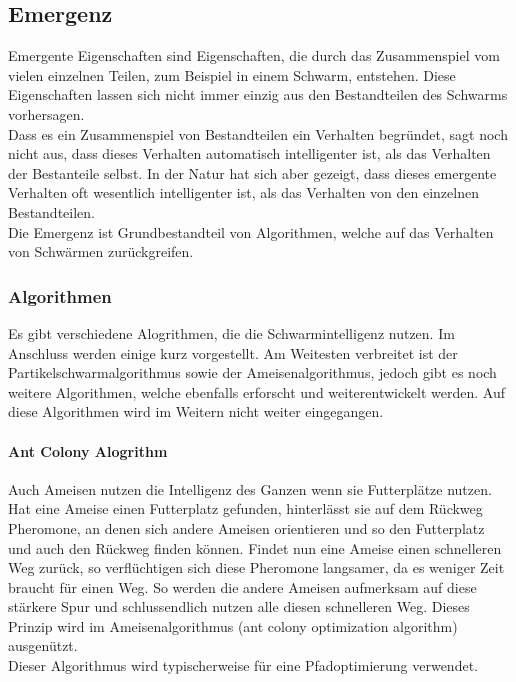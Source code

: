 		\subsection{Emergenz}
		Emergente Eigenschaften sind Eigenschaften, die durch das Zusammenspiel vom vielen einzelnen Teilen, zum Beispiel in einem Schwarm, entstehen. Diese Eigenschaften lassen sich nicht immer einzig aus den Bestandteilen des Schwarms vorhersagen. \\
		Dass es ein Zusammenspiel von Bestandteilen ein Verhalten begründet, sagt noch nicht aus, dass dieses Verhalten automatisch intelligenter ist, als das Verhalten der Bestanteile selbst. In der Natur hat sich aber gezeigt, dass dieses emergente Verhalten oft wesentlich intelligenter ist, als das Verhalten von den einzelnen Bestandteilen. \\
		Die Emergenz ist Grundbestandteil von Algorithmen, welche auf das Verhalten von Schwärmen zurückgreifen.
		
		
				
		\subsubsection{Algorithmen}
		Es gibt verschiedene Alogrithmen, die die Schwarmintelligenz nutzen. Im Anschluss werden einige kurz vorgestellt. Am Weitesten verbreitet ist der Partikelschwarmalgorithmus sowie der Ameisenalgorithmus, jedoch gibt es noch weitere Algorithmen, welche ebenfalls erforscht und weiterentwickelt werden. Auf diese Algorithmen wird im Weitern nicht weiter eingegangen.
		
		\paragraph{Ant Colony Alogrithm}
		$\;$ \\
		Auch Ameisen nutzen die Intelligenz des Ganzen wenn sie Futterplätze nutzen. Hat eine Ameise einen Futterplatz gefunden, hinterlässt sie auf dem Rückweg Pheromone, an denen sich andere Ameisen orientieren und so den Futterplatz und auch den Rückweg finden können. Findet nun eine Ameise einen schnelleren Weg zurück, so verflüchtigen sich diese Pheromone langsamer, da es weniger Zeit braucht für einen Weg. So werden die andere Ameisen aufmerksam auf diese stärkere Spur und schlussendlich nutzen alle diesen schnelleren Weg. Dieses Prinzip wird im Ameisenalgorithmus (ant colony optimization algorithm) ausgenützt.\\Dieser Algorithmus wird typischerweise für eine Pfadoptimierung verwendet.
		
